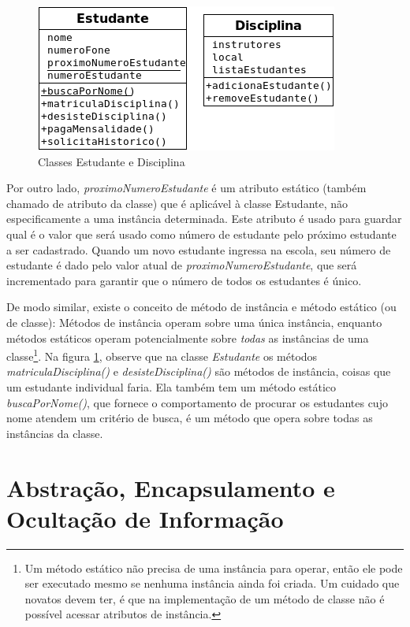 \documentclass[
	11pt,				%
	openright,
	twoside,			%
	a4paper,			%
	english,			%
	french,
	brazil,				%
	sumario=tradicional
	]{abntex2}
\begin{document}
\begin{figure}[h]
\begin{center}
\includegraphics[scale=0.85]{class1.png} 
\caption{Classes Estudante e Disciplina} \label{fig:class1}
\end{center}
\end{figure}

Por outro lado, \emph{proximoNumeroEstudante} é um atributo estático (também chamado de atributo da classe) que é aplicável à classe Estudante, não especificamente a uma instância determinada. Este atributo é usado para guardar qual é o valor que será usado como número de estudante pelo próximo estudante a ser cadastrado. Quando um novo estudante ingressa na escola, seu número de estudante é dado pelo valor atual de \emph{proximoNumeroEstudante}, que será incrementado para garantir que o número de todos os estudantes é único.

De modo similar, existe o conceito de método de instância e método estático (ou de classe): Métodos de instância operam sobre uma única instância, enquanto métodos estáticos operam potencialmente sobre \textit{todas} as instâncias de uma classe\footnote{Um método estático não precisa de uma instância para operar, então ele pode ser executado mesmo se nenhuma instância ainda foi criada. Um cuidado que novatos devem ter, é que na implementação de um método de classe não é possível acessar atributos de instância.}. Na figura \ref{fig:class1}, observe que na classe \emph{Estudante} os métodos \emph{matriculaDisciplina()} e \emph{desisteDisciplina()} são métodos de instância, coisas que um estudante individual faria. Ela também tem um método estático \emph{buscaPorNome()}, que fornece o comportamento de procurar os estudantes cujo nome atendem um critério de busca, é um método que opera sobre todas as instâncias da classe.

\section{Abstração, Encapsulamento e Ocultação de Informação}
\end{document}
